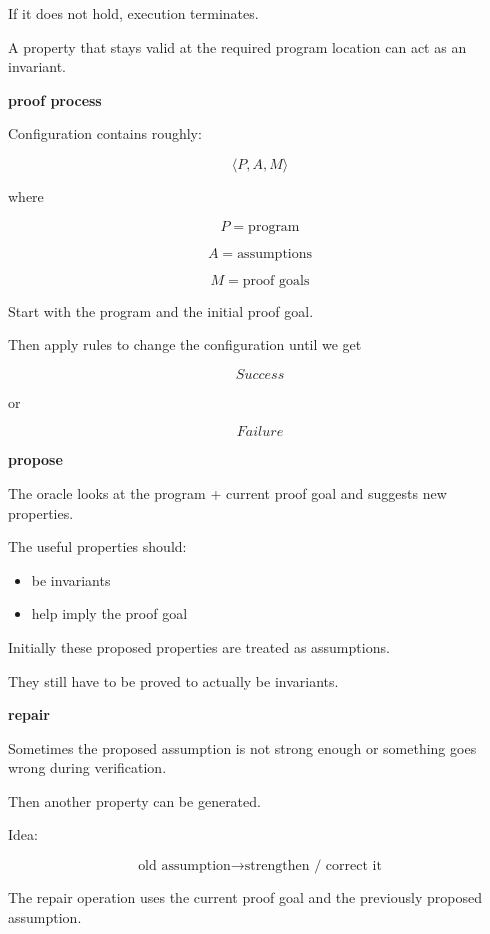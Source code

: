 \documentclass[11pt]{article}
\begin{document}
If it does not hold, execution terminates.

A property that stays valid at the required program
location can act as an invariant.

\vspace{7pt}

\textbf{proof process}

Configuration contains roughly:

\[
\langle P,A,M\rangle
\]

where

\[
P = \text{program}
\]

\[
A = \text{assumptions}
\]

\[
M = \text{proof goals}
\]

Start with the program and the initial proof goal.

Then apply rules to change the configuration until
we get

\[
Success
\]

or

\[
Failure
\]

\vspace{7pt}

\textbf{propose}

The oracle looks at the program + current proof goal
and suggests new properties.

The useful properties should:

\begin{itemize}[leftmargin=18pt,itemsep=1pt]
    \item be invariants
    \item help imply the proof goal
\end{itemize}

Initially these proposed properties are treated
as assumptions.

They still have to be proved to actually be invariants.

\vspace{7pt}

\textbf{repair}

Sometimes the proposed assumption is not strong enough
or something goes wrong during verification.

Then another property can be generated.

Idea:

\[
\text{old assumption}
\rightarrow
\text{strengthen / correct it}
\]

The repair operation uses the current proof goal
and the previously proposed assumption.
\end{document}
